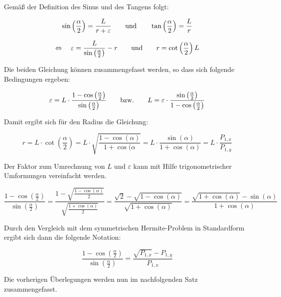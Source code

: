  \bigskip
 
 Gemäß der Definition des Sinus und des Tangens folgt:
 
 $$\sin\left(\frac{\alpha}{2}\right)= \frac{L}{r+\varepsilon}
 \qquad \hbox{und}\qquad \tan\left(\frac{\alpha}{2}\right)= \frac{L}{r}$$
 
 $$\Leftrightarrow\quad 
 \varepsilon = \frac{L}{\sin\left(\frac{\alpha}{2}\right)} - r
 \qquad \hbox{und}\qquad 
  r = \cot\left(\frac{\alpha}{2}\right) L$$
 
 Die beiden Gleichung können zusammengefasst werden, so dass sich folgende Bedingungen  ergeben:
 
 $$\varepsilon = L \cdot \frac{1-\cos\left(\frac{\alpha}{2}\right)}{\sin\left(\frac{\alpha}{2}\right)}
 \qquad \hbox{bzw.} \qquad  L = \varepsilon \cdot \frac{\sin\left(\frac{\alpha}{2}\right)}{1-\cos\left(\frac{\alpha}{2}\right)}$$
 
 Damit ergibt sich für den Radius die Gleichung:
 
 $$r = L \cdot \cot\left(\frac{\alpha}{2}\right)
 = L \cdot \sqrt{\frac{1-\cos(\alpha)}{1+\cos(\alpha}}
 = L \cdot \frac{\sin(\alpha)}{1+\cos(\alpha)} = L \cdot \frac{P_{1,x}}{P_{1,y}}$$
 
 
 Der Faktor zum Umrechnung von $L$ und $\varepsilon$ kann mit Hilfe trigonometrischer Umformungen  vereinfacht werden.
 
 
 \bigskip
 
 
 $$\frac{1-\cos\left(\frac{\alpha}{2}\right)}{\sin\left(\frac{\alpha}{2}\right)}
 =
 \frac{1-\sqrt{\frac{1-\cos(\alpha)}{2}}}{\sqrt{\frac{1+\cos(\alpha)}{2}}}
 =
  \frac{\sqrt{2}-\sqrt{1-\cos(\alpha)}}{\sqrt{1+\cos(\alpha)}}
 = 
 \frac{\sqrt{1+\cos(\alpha)}-\sin(\alpha) }{1+\cos(\alpha)}
 $$
 
 Durch den Vergleich mit dem symmetrischen Hermite-Problem in Standardform ergibt sich dann die folgende Notation:
 
  
 $$\frac{1-\cos\left(\frac{\alpha}{2}\right)}{\sin\left(\frac{\alpha}{2}\right)}
 =
 \frac{\sqrt{P_{1,x}}-P_{1,y}}{P_{1,x}}
 $$
 
 Die vorherigen Überlegungen werden nun im nachfolgenden Satz zusammengefasst.
 
 \bigskip
 
